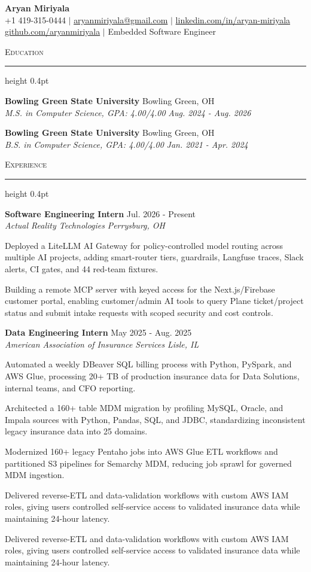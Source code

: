 \documentclass[letterpaper,11pt]{article}
\newcommand{\resumesection}[1]{%
  \par\vspace{2pt}%
  {\large\scshape #1}\par\vspace{2pt}%
  \hrule height 0.4pt\vspace{2pt}%
}
\newcommand{\resumeSubheading}[4]{
  \textbf{#1} \hfill #2\\
  \textit{#3} \hfill \textit{#4}
}
\begin{document}
\begin{center}
  {\LARGE \textbf{Aryan Miriyala}}\\[2pt]
  \small
  +1 419-315-0444 $|$ \href{mailto:aryanmiriyala@gmail.com}{aryanmiriyala@gmail.com} $|$ \href{https://www.linkedin.com/in/aryan-miriyala-7788a21b6/}{linkedin.com/in/aryan-miriyala}\\
  \href{https://github.com/aryanmiriyala}{github.com/aryanmiriyala} $|$ Embedded Software Engineer
\end{center}\vspace{-6pt}

\resumesection{Education}
\resumeSubheading
{Bowling Green State University}{Bowling Green, OH}
{M.S. in Computer Science, GPA: 4.00/4.00}{Aug. 2024 - Aug. 2026}

\resumeSubheading
{Bowling Green State University}{Bowling Green, OH}
{B.S. in Computer Science, GPA: 4.00/4.00}{Jan. 2021 - Apr. 2024}

\resumesection{Experience}
\resumeSubheading
{Software Engineering Intern}{Jul. 2026 - Present}
{Actual Reality Technologies}{Perrysburg, OH}
\begin{tightitemize}
  \item Deployed a LiteLLM AI Gateway for policy-controlled model routing across multiple AI projects, adding smart-router tiers, guardrails, Langfuse traces, Slack alerts, CI gates, and 44 red-team fixtures.
  \item Building a remote MCP server with keyed access for the Next.js/Firebase customer portal, enabling customer/admin AI tools to query Plane ticket/project status and submit intake requests with scoped security and cost controls.
\end{tightitemize}

\resumeSubheading
{Data Engineering Intern}{May 2025 - Aug. 2025}
{American Association of Insurance Services}{Lisle, IL}
\begin{tightitemize}
  \item Automated a weekly DBeaver SQL billing process with Python, PySpark, and AWS Glue, processing 20+ TB of production insurance data for Data Solutions, internal teams, and CFO reporting.
  \item Architected a 160+ table MDM migration by profiling MySQL, Oracle, and Impala sources with Python, Pandas, SQL, and JDBC, standardizing inconsistent legacy insurance data into 25 domains.
  \item Modernized 160+ legacy Pentaho jobs into AWS Glue ETL workflows and partitioned S3 pipelines for Semarchy MDM, reducing job sprawl for governed MDM ingestion.
  \item Delivered reverse-ETL and data-validation workflows with custom AWS IAM roles, giving users controlled self-service access to validated insurance data while maintaining 24-hour latency.
  \item Delivered reverse-ETL and data-validation workflows with custom AWS IAM roles, giving users controlled self-service access to validated insurance data while maintaining 24-hour latency.
\end{tightitemize}
\end{document}
